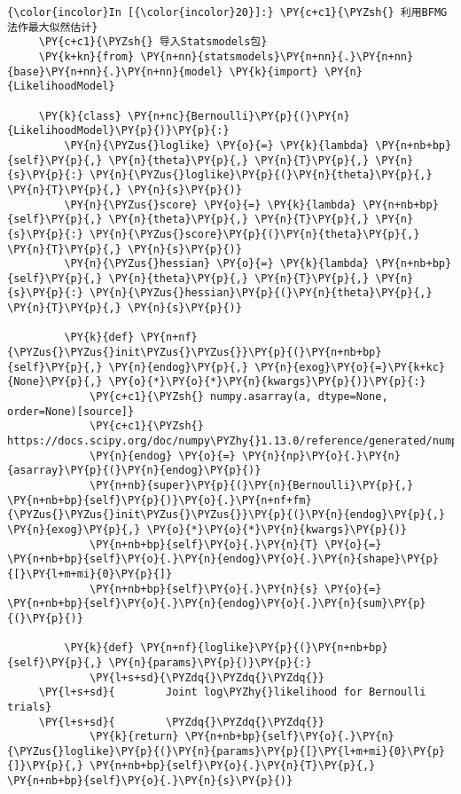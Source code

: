\begin{Verbatim}[commandchars=\\\{\}]
{\color{incolor}In [{\color{incolor}20}]:} \PY{c+c1}{\PYZsh{} 利用BFMG法作最大似然估计}
     \PY{c+c1}{\PYZsh{} 导入Statsmodels包}
     \PY{k+kn}{from} \PY{n+nn}{statsmodels}\PY{n+nn}{.}\PY{n+nn}{base}\PY{n+nn}{.}\PY{n+nn}{model} \PY{k}{import} \PY{n}{LikelihoodModel}

     \PY{k}{class} \PY{n+nc}{Bernoulli}\PY{p}{(}\PY{n}{LikelihoodModel}\PY{p}{)}\PY{p}{:}
         \PY{n}{\PYZus{}loglike} \PY{o}{=} \PY{k}{lambda} \PY{n+nb+bp}{self}\PY{p}{,} \PY{n}{theta}\PY{p}{,} \PY{n}{T}\PY{p}{,} \PY{n}{s}\PY{p}{:} \PY{n}{\PYZus{}loglike}\PY{p}{(}\PY{n}{theta}\PY{p}{,} \PY{n}{T}\PY{p}{,} \PY{n}{s}\PY{p}{)}
         \PY{n}{\PYZus{}score} \PY{o}{=} \PY{k}{lambda} \PY{n+nb+bp}{self}\PY{p}{,} \PY{n}{theta}\PY{p}{,} \PY{n}{T}\PY{p}{,} \PY{n}{s}\PY{p}{:} \PY{n}{\PYZus{}score}\PY{p}{(}\PY{n}{theta}\PY{p}{,} \PY{n}{T}\PY{p}{,} \PY{n}{s}\PY{p}{)}
         \PY{n}{\PYZus{}hessian} \PY{o}{=} \PY{k}{lambda} \PY{n+nb+bp}{self}\PY{p}{,} \PY{n}{theta}\PY{p}{,} \PY{n}{T}\PY{p}{,} \PY{n}{s}\PY{p}{:} \PY{n}{\PYZus{}hessian}\PY{p}{(}\PY{n}{theta}\PY{p}{,} \PY{n}{T}\PY{p}{,} \PY{n}{s}\PY{p}{)}

         \PY{k}{def} \PY{n+nf}{\PYZus{}\PYZus{}init\PYZus{}\PYZus{}}\PY{p}{(}\PY{n+nb+bp}{self}\PY{p}{,} \PY{n}{endog}\PY{p}{,} \PY{n}{exog}\PY{o}{=}\PY{k+kc}{None}\PY{p}{,} \PY{o}{*}\PY{o}{*}\PY{n}{kwargs}\PY{p}{)}\PY{p}{:}
             \PY{c+c1}{\PYZsh{} numpy.asarray(a, dtype=None, order=None)[source]}
             \PY{c+c1}{\PYZsh{} https://docs.scipy.org/doc/numpy\PYZhy{}1.13.0/reference/generated/numpy.asarray.html}
             \PY{n}{endog} \PY{o}{=} \PY{n}{np}\PY{o}{.}\PY{n}{asarray}\PY{p}{(}\PY{n}{endog}\PY{p}{)}
             \PY{n+nb}{super}\PY{p}{(}\PY{n}{Bernoulli}\PY{p}{,} \PY{n+nb+bp}{self}\PY{p}{)}\PY{o}{.}\PY{n+nf+fm}{\PYZus{}\PYZus{}init\PYZus{}\PYZus{}}\PY{p}{(}\PY{n}{endog}\PY{p}{,} \PY{n}{exog}\PY{p}{,} \PY{o}{*}\PY{o}{*}\PY{n}{kwargs}\PY{p}{)}
             \PY{n+nb+bp}{self}\PY{o}{.}\PY{n}{T} \PY{o}{=} \PY{n+nb+bp}{self}\PY{o}{.}\PY{n}{endog}\PY{o}{.}\PY{n}{shape}\PY{p}{[}\PY{l+m+mi}{0}\PY{p}{]}
             \PY{n+nb+bp}{self}\PY{o}{.}\PY{n}{s} \PY{o}{=} \PY{n+nb+bp}{self}\PY{o}{.}\PY{n}{endog}\PY{o}{.}\PY{n}{sum}\PY{p}{(}\PY{p}{)}

         \PY{k}{def} \PY{n+nf}{loglike}\PY{p}{(}\PY{n+nb+bp}{self}\PY{p}{,} \PY{n}{params}\PY{p}{)}\PY{p}{:}
             \PY{l+s+sd}{\PYZdq{}\PYZdq{}\PYZdq{}}
     \PY{l+s+sd}{        Joint log\PYZhy{}likelihood for Bernoulli trials}
     \PY{l+s+sd}{        \PYZdq{}\PYZdq{}\PYZdq{}}
             \PY{k}{return} \PY{n+nb+bp}{self}\PY{o}{.}\PY{n}{\PYZus{}loglike}\PY{p}{(}\PY{n}{params}\PY{p}{[}\PY{l+m+mi}{0}\PY{p}{]}\PY{p}{,} \PY{n+nb+bp}{self}\PY{o}{.}\PY{n}{T}\PY{p}{,} \PY{n+nb+bp}{self}\PY{o}{.}\PY{n}{s}\PY{p}{)}


\end{Verbatim}
